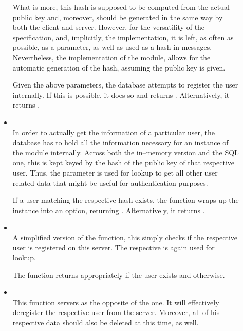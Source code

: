 \begin{description}
\begin{itemize}
  What is more, this hash is supposed to be computed from the actual public key and, moreover, should be generated in the same way by both the client and server.
  However, for the versatility of the specification, and, implicitly, the implementation, it is left, as often as possible, as a parameter, as well as used as a hash in messages.
  Nevertheless, the implementation of the  module, allows for the automatic generation of the hash, assuming the public key is given.

  Given the above parameters, the database attempts to register the user internally.
  If this is possible, it does so and returns .
  Alternatively, it returns .

  \item {} \\
  In order to actually get the information of a particular user, the database has to hold all the information necessary for an instance of the  module internally.
  Across both the in--memory version and the SQL one, this is kept keyed by the hash of the public key of that respective user.
  Thus, the parameter  is used for lookup to get all other user related data that might be useful for authentication purposes.

  If a user matching the respective hash exists, the function wraps up the  instance into an option, returning .
  Alternatively, it returns .

  \item {} \\
  A simplified version of the  function, this simply checks if the respective user is registered on this server.
  The respective  is again used for lookup.

  The function returns appropriately  if the user exists and  otherwise.

  \item {} \\
  This function servers as the opposite of the  one.
  It will effectively deregister the respective user from the server.
  Moreover, all of his respective data should also be deleted at this time, as well.


\end{itemize}
\end{description}
